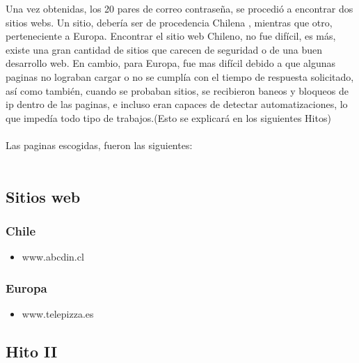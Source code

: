 \documentclass{article}
\begin{document}
    Una vez obtenidas, los 20 pares de correo contraseña, se procedió a encontrar dos sitios webs. Un sitio, debería ser de procedencia Chilena
    , mientras que otro, perteneciente a Europa. 
    \newline
    Encontrar el sitio web Chileno, no fue difícil, es más, existe una gran cantidad de sitios que carecen de seguridad o de una buen
    desarrollo web. En cambio, para Europa, fue mas difícil debido a que algunas paginas no lograban cargar o no se cumplía con el tiempo de
    respuesta solicitado, así como también, cuando se probaban sitios, se recibieron baneos y bloqueos de ip dentro de las paginas, e incluso
    eran capaces de detectar automatizaciones, lo que impedía todo tipo de trabajos.(Esto se explicará en los siguientes Hitos)
    \\\\
    Las paginas escogidas, fueron las siguientes: 
    \\\\
    \subsection{Sitios web}
        \subsubsection{Chile}
        \begin{itemize}
            \item www.abcdin.cl
        \end{itemize}

        \subsubsection{Europa}
        \begin{itemize}
            \item www.telepizza.es
        \end{itemize}

\newpage

\subsection{Hito II}
\end{document}
